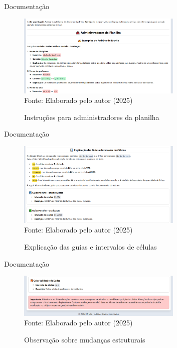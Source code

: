 \begin{frame}{Documentação}
    \begin{figure}
        \centering
        \vspace{-0.3cm}
        \caption{Instruções para administradores da planilha}
        \vspace{-0.2cm}
        \includegraphics[width=0.7\textwidth]{figuras/doc-2.png}
        \\ %
        \small Fonte: Elaborado pelo autor (2025)
    \end{figure}
\end{frame}

\begin{frame}{Documentação}
    \begin{figure}
        \centering
        \vspace{-0.3cm}
        \caption{Explicação das guias e intervalos de células}
        \vspace{-0.2cm}
        \includegraphics[width=0.7\textwidth]{figuras/doc-3.png}
        \\ %
        \small Fonte: Elaborado pelo autor (2025)
    \end{figure}
\end{frame}

\begin{frame}{Documentação}
    \begin{figure}
        \centering
        \vspace{-0.3cm}
        \caption{Observação sobre mudanças estruturais}
        \vspace{-0.2cm}
        \includegraphics[width=0.7\textwidth]{figuras/doc-4.png}
        \\ %
        \small Fonte: Elaborado pelo autor (2025)
    \end{figure}
\end{frame}